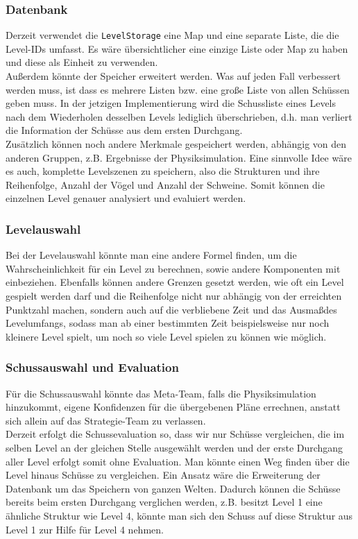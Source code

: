 \subsubsection{Datenbank}
Derzeit verwendet die \texttt{LevelStorage} eine Map und eine separate Liste, die die Level-IDs umfasst. Es wäre übersichtlicher eine einzige Liste oder Map zu haben und diese als Einheit zu verwenden. \\
Au\ss erdem könnte der Speicher erweitert werden. Was auf jeden Fall verbessert werden muss, ist dass es mehrere Listen bzw. eine gro\ss e Liste von allen Schüssen geben muss. In der jetzigen Implementierung wird die Schussliste eines Levels nach dem Wiederholen desselben Levels lediglich überschrieben, d.h. man verliert die Information der Schüsse aus dem ersten Durchgang. \\
Zusätzlich können noch andere Merkmale gespeichert werden, abhängig von den anderen Gruppen, z.B. Ergebnisse der Physiksimulation. Eine sinnvolle Idee wäre es auch, komplette Levelszenen zu speichern, also die Strukturen und ihre Reihenfolge, Anzahl der Vögel und Anzahl der Schweine. Somit können die einzelnen Level genauer analysiert und evaluiert werden.
\subsubsection{Levelauswahl}
Bei der Levelauswahl könnte man eine andere Formel finden, um die Wahrscheinlichkeit für ein Level zu berechnen, sowie andere Komponenten mit einbeziehen. Ebenfalls können andere Grenzen gesetzt werden, wie oft ein Level gespielt werden darf und die Reihenfolge nicht nur abhängig von der erreichten Punktzahl machen, sondern auch auf die verbliebene Zeit und das Ausma\ss  des Levelumfangs, sodass man ab einer bestimmten Zeit beispielsweise nur noch kleinere Level spielt, um noch so viele Level spielen zu können wie möglich.
\subsubsection{Schussauswahl und Evaluation}
Für die Schussauswahl könnte das Meta-Team, falls die Physiksimulation hinzukommt, eigene Konfidenzen für die übergebenen Pläne errechnen, anstatt sich allein auf das Strategie-Team zu verlassen.  \\
Derzeit erfolgt die Schussevaluation so, dass wir nur Schüsse vergleichen, die im selben Level an der gleichen Stelle ausgewählt werden und der erste Durchgang aller Level erfolgt somit ohne Evaluation. Man könnte einen Weg finden über die Level hinaus Schüsse zu vergleichen. Ein Ansatz wäre die Erweiterung der Datenbank um das Speichern von ganzen Welten. Dadurch können die Schüsse bereits beim ersten Durchgang verglichen werden, z.B. besitzt Level 1 eine ähnliche Struktur wie Level 4, könnte man sich den Schuss auf diese Struktur aus Level 1 zur Hilfe für Level 4 nehmen. 

